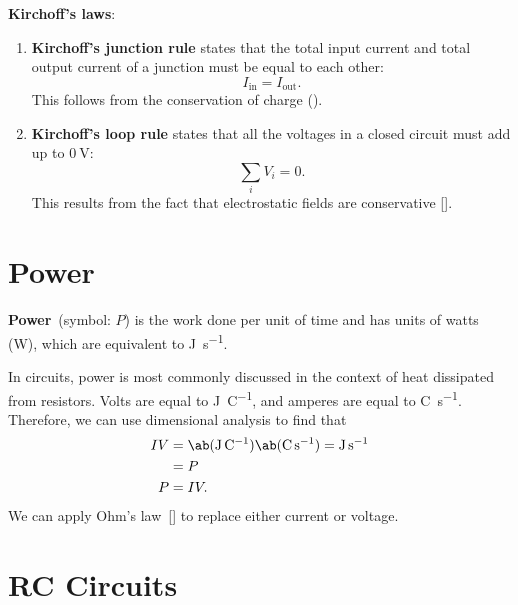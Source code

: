 \textbf{Kirchoff's laws}:
\begin{enumerate}
    \item \textbf{Kirchoff's junction rule}
        states that the total input current and total output current
        of a junction must be equal to each other:
        \begin{equation}
            I_\mathrm{in} = I_\mathrm{out}.
        \end{equation}
        This follows from the conservation of charge
        ().
    \item \textbf{Kirchoff's loop rule} states that all the voltages
        in a closed circuit must add up to \(\qty{0}{\volt}\):
        \begin{equation} \label{eq:kirchoffs-loop-rule}
            \sum_i V_i = 0.
        \end{equation}
        This results from the fact that electrostatic fields are conservative
        [].
\end{enumerate}

\section{Power}

\textbf{Power}~(symbol: \(P\)) is the work done per unit of time
and has units of watts (\unit{\watt}),
which are equivalent to \unit{\joule \per \second}.

In circuits,
power is most commonly discussed in the context of heat dissipated
from resistors.
Volts are equal to \unit{\joule \per \coulomb},
and amperes are equal to \unit{\coulomb \per \second}.
Therefore, we can use dimensional analysis to find that
\begin{equation}
    \begin{aligned}
        I V
        &= \ab(\unit{\joule \per \coulomb})
        \ab(\unit{\coulomb\per \second})
        = \unit{\joule \per \second} \\
        &= P \\
        P &= I V.
    \end{aligned}
\end{equation}
We can apply Ohm's law~[] to replace either
current or voltage.

\section{RC Circuits}

